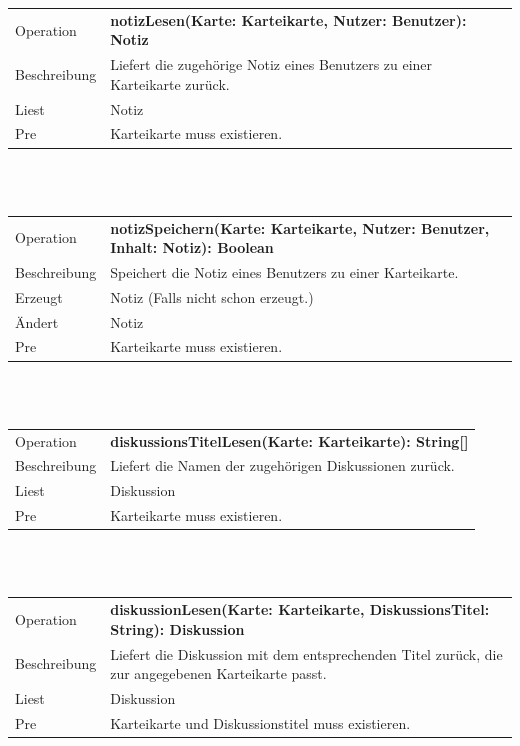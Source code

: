\documentclass[12pt,a4paper]{article}
\begin{document}
{\begin{tabular}{|l|p{12cm}|}
	\hline
	Operation &  \textbf{notizLesen(Karte: Karteikarte, Nutzer: Benutzer): Notiz} \\ 
	Beschreibung & Liefert die zugehörige Notiz eines Benutzers zu einer Karteikarte zurück.\\ 
	Liest & Notiz \\ 
	Pre & Karteikarte muss existieren. \\ 
	\hline 
\end{tabular} \\\\

\begin{tabular}{|l|p{12cm}|}
	\hline
	Operation &  \textbf{notizSpeichern(Karte: Karteikarte, Nutzer: Benutzer, Inhalt: Notiz): Boolean} \\ 
	Beschreibung & Speichert die Notiz eines Benutzers zu einer Karteikarte.\\ 
	Erzeugt & Notiz (Falls nicht schon erzeugt.) \\ 
	Ändert & Notiz \\ 
	Pre & Karteikarte muss existieren. \\ 
	\hline 
\end{tabular} \\\\

\begin{tabular}{|l|p{12cm}|}
	\hline
	Operation &  \textbf{diskussionsTitelLesen(Karte: Karteikarte): String[]} \\ 
	Beschreibung & Liefert die Namen der zugehörigen Diskussionen zurück.\\ 
	Liest & Diskussion \\ 
	Pre & Karteikarte muss existieren. \\ 
	\hline 
\end{tabular} \\\\

\begin{tabular}{|l|p{12cm}|}
	\hline
	Operation &  \textbf{diskussionLesen(Karte: Karteikarte, DiskussionsTitel: String): Diskussion} \\ 
	Beschreibung & Liefert die Diskussion mit dem entsprechenden Titel zurück, die zur angegebenen Karteikarte passt.\\ 
	Liest & Diskussion \\ 
	Pre & Karteikarte und Diskussionstitel muss existieren. \\ 
	\hline 
\end{tabular} \\\\

}
\end{document}
